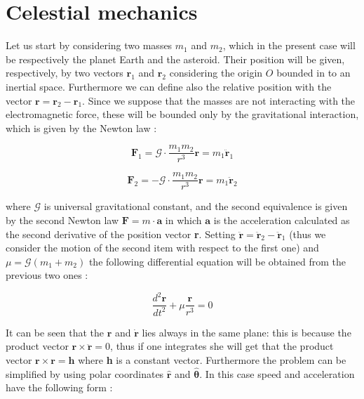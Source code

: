 \documentclass[12pt,%
               a4paper,%
               oneside,openany,%
               titlepage,%
               headinclude,footinclude,%
               BCOR5mm,%
               cleardoublepage=empty,%
               tablecaptionabove,%
               floatperchapter,
               ]{scrreprt}                 %
\begin{document}
\section{Celestial mechanics}

Let us start by considering two masses $m_{1}$ and $m_{2}$, which in the present case will be respectively the planet Earth and the asteroid. Their position will be given, respectively, by two vectors $\textbf{r}_{1}$ and $\textbf{r}_{2}$ considering the origin $O$ bounded in to an inertial space. Furthermore we can define also the relative position with the vector $\textbf{r}=\textbf{r}_{2}-\textbf{r}_{1}$. Since we suppose that the masses are not interacting with the electromagnetic force, these will be bounded only by the gravitational interaction, which is given by the Newton law \cite{murray1999solar}:


\begin{equation}
\textbf{F}_{1}=\mathcal{G} \cdot \frac{m_{1}m_{2}}{r^{3}}\textbf{r}=m_{1} \ddot{\textbf{r}}_{1}
\end{equation}

\begin{equation}
\textbf{F}_{2}=-\mathcal{G} \cdot \frac{m_{1}m_{2}}{r^{3}}\textbf{r}=m_{1} \ddot{\textbf{r}}_{2}
\end{equation}

where $\mathcal{G}$ is universal gravitational constant, and the second equivalence is given by the second Newton law $\textbf{F}=m\cdot \textbf{a}$ in which $\textbf{a}$ is the acceleration calculated as the second derivative of the position vector \textbf{r}. Setting $\ddot{\textbf{r}}=\ddot{\textbf{r}}_{2}-\ddot{\textbf{r}}_{1}$ (thus we consider the motion of the second item with respect to the first one) and $\mu=\mathcal{G}(m_{1}+m_{2})$ the following differential equation will be obtained from the previous two ones \cite{murray1999solar}:

\begin{equation}
\dfrac{d^{2}\textbf{r}}{dt^{2}}+\mu\dfrac{\textbf{r}}{r^{3}}=0
\end{equation}


It can be seen that the $\textbf{r}$ and $\dot{\textbf{r}}$ lies always in the same plane: this is because the product vector $\textbf{r} \times \ddot{ \textbf{r}}=0$, thus if one integrates she will get that the product vector $\textbf{r} \times \textbf{r}=\textbf{h}$ where \textbf{h} is a constant vector. Furthermore the problem can be simplified by using polar coordinates  $\hat{\textbf{r}}$ and $\hat{\boldsymbol{\theta}}$. In this case speed and acceleration have the following form \cite{murray1999solar}:
\end{document}
